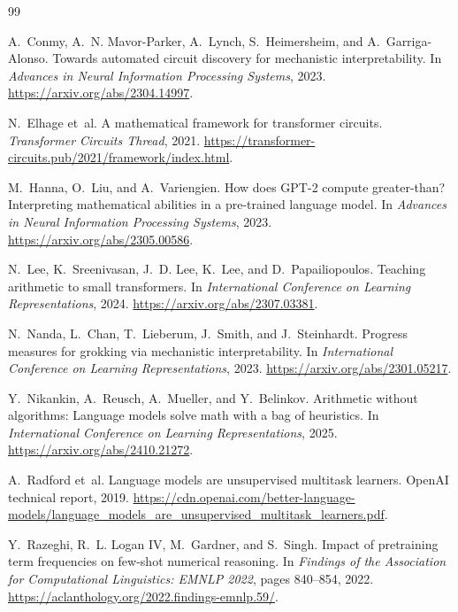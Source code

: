 \documentclass[11pt]{article}
\begin{document}
\begin{thebibliography}{99}

A.~Conmy, A.~N. Mavor-Parker, A.~Lynch, S.~Heimersheim, and A.~Garriga-Alonso.
\newblock Towards automated circuit discovery for mechanistic interpretability.
\newblock In \emph{Advances in Neural Information Processing Systems}, 2023.
\newblock \url{https://arxiv.org/abs/2304.14997}.

N.~Elhage et~al.
\newblock A mathematical framework for transformer circuits.
\newblock \emph{Transformer Circuits Thread}, 2021.
\newblock \url{https://transformer-circuits.pub/2021/framework/index.html}.

M.~Hanna, O.~Liu, and A.~Variengien.
\newblock How does GPT-2 compute greater-than? Interpreting mathematical abilities in a pre-trained language model.
\newblock In \emph{Advances in Neural Information Processing Systems}, 2023.
\newblock \url{https://arxiv.org/abs/2305.00586}.

N.~Lee, K.~Sreenivasan, J.~D. Lee, K.~Lee, and D.~Papailiopoulos.
\newblock Teaching arithmetic to small transformers.
\newblock In \emph{International Conference on Learning Representations}, 2024.
\newblock \url{https://arxiv.org/abs/2307.03381}.

N.~Nanda, L.~Chan, T.~Lieberum, J.~Smith, and J.~Steinhardt.
\newblock Progress measures for grokking via mechanistic interpretability.
\newblock In \emph{International Conference on Learning Representations}, 2023.
\newblock \url{https://arxiv.org/abs/2301.05217}.

Y.~Nikankin, A.~Reusch, A.~Mueller, and Y.~Belinkov.
\newblock Arithmetic without algorithms: Language models solve math with a bag of heuristics.
\newblock In \emph{International Conference on Learning Representations}, 2025.
\newblock \url{https://arxiv.org/abs/2410.21272}.

A.~Radford et~al.
\newblock Language models are unsupervised multitask learners.
\newblock OpenAI technical report, 2019.
\newblock \url{https://cdn.openai.com/better-language-models/language_models_are_unsupervised_multitask_learners.pdf}.

Y.~Razeghi, R.~L. Logan IV, M.~Gardner, and S.~Singh.
\newblock Impact of pretraining term frequencies on few-shot numerical reasoning.
\newblock In \emph{Findings of the Association for Computational Linguistics: EMNLP 2022}, pages 840--854, 2022.
\newblock \url{https://aclanthology.org/2022.findings-emnlp.59/}.


\end{thebibliography}
\end{document}
